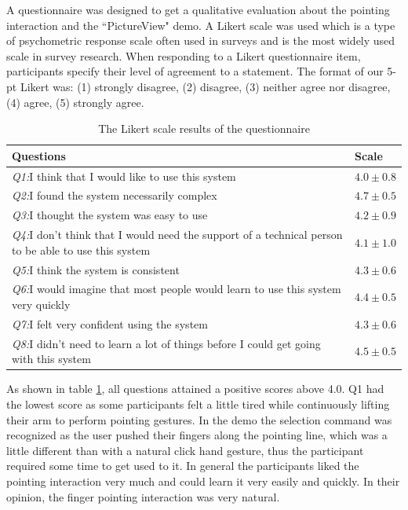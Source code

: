 A questionnaire was designed to get a qualitative evaluation about the pointing interaction and the ``PictureView" demo. A Likert scale was used which is a type of psychometric response scale often used in surveys and is the most widely used scale in survey research. When responding to a Likert questionnaire item, participants specify their level of agreement to a statement. The format of our 5-pt Likert was: (1) strongly disagree, (2) disagree, (3) neither agree nor disagree, (4) agree, (5) strongly agree.
\begin{table}
	\caption{The Likert scale results of the questionnaire}
	\label{tb:3-PAST:questionnaire}
	\scriptsize
	\begin{center}
		\begin{tabular}{p{5.5cm}|p{1.2cm}}
			Questions & Scale \\
			\hline
			\textit{Q1:}I think that I would like to use this system &  $4.0\pm0.8$ \\
			\textit{Q2:}I found the system necessarily complex & $4.7\pm0.5$ \\
			\textit{Q3:}I thought the system was easy to use & $4.2\pm0.9$ \\
			\textit{Q4:}I don't think that I would need the support of a technical person to be able to use this system & $4.1\pm1.0$\\
			\textit{Q5:}I  think the system is consistent & $4.3\pm0.6$ \\
			\textit{Q6:}I would imagine that most people would learn to use this system very quickly & $4.4\pm0.5$ \\
			\textit{Q7:}I felt very confident using the system & $4.3\pm0.6$ \\
			\textit{Q8:}I didn't need to learn a lot of things before I could get going with this system & $4.5\pm0.5$
		\end{tabular}
	\end{center}
\end{table}
As shown in table \ref{tb:3-PAST:questionnaire}, all questions attained a positive scores above 4.0. Q1 had the lowest score as some participants felt a little tired while continuously lifting their arm to perform pointing gestures. In the demo the selection command was recognized as the user pushed their fingers along the pointing line, which was a little different than with a natural click hand gesture, thus the participant required some time to get used to it. In general the participants liked the pointing interaction very much and could learn it very easily and quickly. In their opinion, the finger pointing interaction was very natural. 

